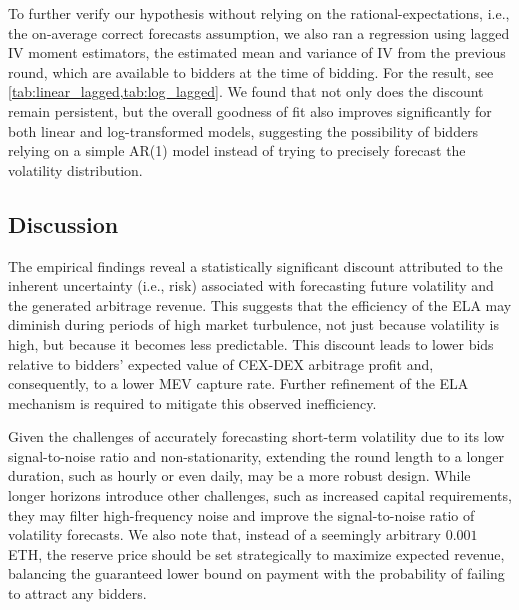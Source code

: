 \documentclass[runningheads]{llncs}
\newcommand{\E}{\mathbb{E}}
\newcommand{\Var}{\mathrm{Var}}
\newcommand{\IV}{\mathrm{IV}}
\begin{document}
To further verify our hypothesis without relying on the rational-expectations, i.e., the on-average correct forecasts assumption, we also ran a regression using lagged IV moment estimators, the estimated mean and variance of IV from the previous round, which are available to bidders at the time of bidding. For the result, see \cref{tab:linear_lagged,tab:log_lagged}. We found that not only does the discount remain persistent, but the overall goodness of fit also improves significantly for both linear and log-transformed models, suggesting the possibility of bidders relying on a simple AR(1) model instead of trying to precisely forecast the volatility distribution.

\subsection{Discussion}
The empirical findings reveal a statistically significant discount attributed to the inherent uncertainty (i.e., risk) associated with forecasting future volatility and the generated arbitrage revenue. 
This suggests that the efficiency of the ELA may diminish during periods of high market turbulence, not just because volatility is high, but because it becomes less predictable. This discount leads to lower bids relative to bidders' expected value of CEX-DEX arbitrage profit and, consequently, to a lower MEV capture rate. Further refinement of the ELA mechanism is required to mitigate this observed inefficiency. 

Given the challenges of accurately forecasting short-term volatility due to its low signal-to-noise ratio and non-stationarity, extending the round length to a longer duration, such as hourly or even daily, may be a more robust design. While longer horizons introduce other challenges, such as increased capital requirements, they may filter high-frequency noise and improve the signal-to-noise ratio of volatility forecasts. We also note that, instead of a seemingly arbitrary $0.001$ ETH, the reserve price should be set strategically to maximize expected revenue, balancing the guaranteed lower bound on payment with the probability of failing to attract any bidders.
\end{document}
